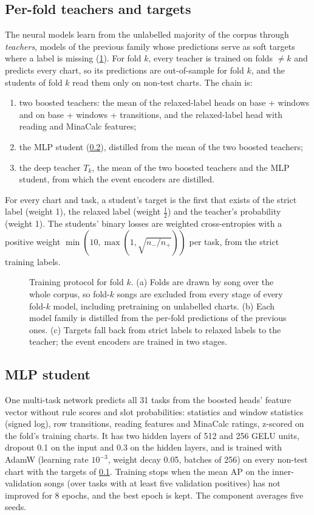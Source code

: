 \documentclass[10pt,twocolumn]{article}
\begin{document}
\subsection{Per-fold teachers and targets}\label{sec:teachers}
The neural models learn from the unlabelled majority of the corpus through \emph{teachers}, models of the previous family whose predictions serve as soft targets where a label is missing (\cref{fig:protocol}). For fold $k$, every teacher is trained on folds $\neq k$ and predicts every chart, so its predictions are out-of-sample for fold $k$, and the students of fold $k$ read them only on non-test charts. The chain is:
\begin{enumerate}\setlength\itemsep{1pt}
\item two boosted teachers: the mean of the relaxed-label heads on base + windows and on base + windows + transitions, and the relaxed-label head with reading and MinaCalc features;
\item the MLP student (\cref{sec:mlp}), distilled from the mean of the two boosted teachers;
\item the deep teacher $T_k$, the mean of the two boosted teachers and the MLP student, from which the event encoders are distilled.
\end{enumerate}
For every chart and task, a student's target is the first that exists of the strict label (weight 1), the relaxed label (weight $\tfrac12$) and the teacher's probability (weight 1). The students' binary losses are weighted cross-entropies with a positive weight $\min(10,\max(1,\sqrt{n_-/n_+}))$ per task, from the strict training labels.

\begin{figure}[t]
\centering
\resizebox{\textwidth}{!}{}
\caption{Training protocol for fold $k$. (a) Folds are drawn by song over the whole corpus, so fold-$k$ songs are excluded from every stage of every fold-$k$ model, including pretraining on unlabelled charts. (b) Each model family is distilled from the per-fold predictions of the previous ones. (c) Targets fall back from strict labels to relaxed labels to the teacher; the event encoders are trained in two stages.}
\label{fig:protocol}
\end{figure}

\subsection{MLP student}\label{sec:mlp}
One multi-task network predicts all 31 tasks from the boosted heads' feature vector without rule scores and slot probabilities: statistics and window statistics (signed log), row transitions, reading features and MinaCalc ratings, z-scored on the fold's training charts. It has two hidden layers of 512 and 256 GELU units, dropout 0.1 on the input and 0.3 on the hidden layers, and is trained with AdamW \citep{loshchilov2019adamw} (learning rate $10^{-3}$, weight decay 0.05, batches of 256) on every non-test chart with the targets of \cref{sec:teachers}. Training stops when the mean AP on the inner-validation songs (over tasks with at least five validation positives) has not improved for 8 epochs, and the best epoch is kept. The component averages five seeds.
\end{document}
